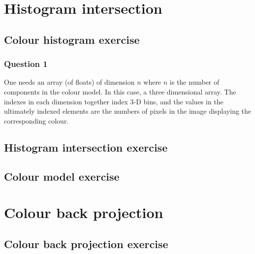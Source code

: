 \documentclass[abstract=true]{scrartcl}
\title{}
\author{Joris Stork, Lucas Swartsenburg}
\begin{document}
\maketitle


\section{Histogram intersection}

    \subsection{Colour histogram exercise}

        \subsubsection{Question 1}

            One needs an array (of floats) of dimension $n$ where $n$ is the
            number of components in the colour model. In this case, a three
            dimensional array. The indexes in each dimension together index 3-D
            bins, and the values in the ultimately indexed elements are the
            numbers of pixels in the image displaying the corresponding colour. 

\subsection{Histogram intersection exercise}

\subsection{Colour model exercise}


\section{Colour back projection}

\subsection{Colour back projection exercise}
\end{document}
